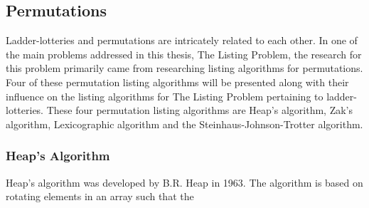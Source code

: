 \subsection{Permutations}
Ladder-lotteries and permutations are intricately related to each other. In one of the main problems addressed in this thesis, The Listing Problem, 
the research for this problem primarily came from researching listing algorithms for permutations. Four of these 
permutation listing algorithms will be presented along with their influence on the listing algorithms for The Listing Problem 
pertaining to ladder-lotteries. These four permutation listing algorithms are Heap's algorithm, Zak's algorithm, Lexicographic algorithm 
and the Steinhaus-Johnson-Trotter algorithm. 

\subsubsection{Heap's Algorithm}
Heap's algorithm was developed by B.R. Heap in 1963. The algorithm is based on rotating elements in an array such that the 